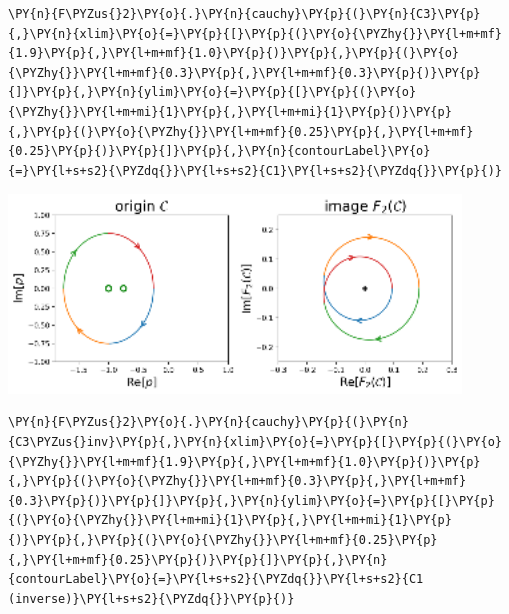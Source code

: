 \begin{tcolorbox}[breakable, size=fbox, boxrule=1pt, pad at break*=1mm,colback=cellbackground, colframe=cellborder]
\begin{Verbatim}[commandchars=\\\{\}]
\PY{n}{F\PYZus{}2}\PY{o}{.}\PY{n}{cauchy}\PY{p}{(}\PY{n}{C3}\PY{p}{,}\PY{n}{xlim}\PY{o}{=}\PY{p}{[}\PY{p}{(}\PY{o}{\PYZhy{}}\PY{l+m+mf}{1.9}\PY{p}{,}\PY{l+m+mf}{1.0}\PY{p}{)}\PY{p}{,}\PY{p}{(}\PY{o}{\PYZhy{}}\PY{l+m+mf}{0.3}\PY{p}{,}\PY{l+m+mf}{0.3}\PY{p}{)}\PY{p}{]}\PY{p}{,}\PY{n}{ylim}\PY{o}{=}\PY{p}{[}\PY{p}{(}\PY{o}{\PYZhy{}}\PY{l+m+mi}{1}\PY{p}{,}\PY{l+m+mi}{1}\PY{p}{)}\PY{p}{,}\PY{p}{(}\PY{o}{\PYZhy{}}\PY{l+m+mf}{0.25}\PY{p}{,}\PY{l+m+mf}{0.25}\PY{p}{)}\PY{p}{]}\PY{p}{,}\PY{n}{contourLabel}\PY{o}{=}\PY{l+s+s2}{\PYZdq{}}\PY{l+s+s2}{C1}\PY{l+s+s2}{\PYZdq{}}\PY{p}{)}
\end{Verbatim}
\end{tcolorbox}
\begin{center}
    \includegraphics[width=0.9\textwidth]{notebook/fig/output_28_1.eps}
\end{center}
\begin{tcolorbox}[breakable, size=fbox, boxrule=1pt, pad at break*=1mm,colback=cellbackground, colframe=cellborder]
\begin{Verbatim}[commandchars=\\\{\}]
\PY{n}{F\PYZus{}2}\PY{o}{.}\PY{n}{cauchy}\PY{p}{(}\PY{n}{C3\PYZus{}inv}\PY{p}{,}\PY{n}{xlim}\PY{o}{=}\PY{p}{[}\PY{p}{(}\PY{o}{\PYZhy{}}\PY{l+m+mf}{1.9}\PY{p}{,}\PY{l+m+mf}{1.0}\PY{p}{)}\PY{p}{,}\PY{p}{(}\PY{o}{\PYZhy{}}\PY{l+m+mf}{0.3}\PY{p}{,}\PY{l+m+mf}{0.3}\PY{p}{)}\PY{p}{]}\PY{p}{,}\PY{n}{ylim}\PY{o}{=}\PY{p}{[}\PY{p}{(}\PY{o}{\PYZhy{}}\PY{l+m+mi}{1}\PY{p}{,}\PY{l+m+mi}{1}\PY{p}{)}\PY{p}{,}\PY{p}{(}\PY{o}{\PYZhy{}}\PY{l+m+mf}{0.25}\PY{p}{,}\PY{l+m+mf}{0.25}\PY{p}{)}\PY{p}{]}\PY{p}{,}\PY{n}{contourLabel}\PY{o}{=}\PY{l+s+s2}{\PYZdq{}}\PY{l+s+s2}{C1 (inverse)}\PY{l+s+s2}{\PYZdq{}}\PY{p}{)}
\end{Verbatim}
\end{tcolorbox}
